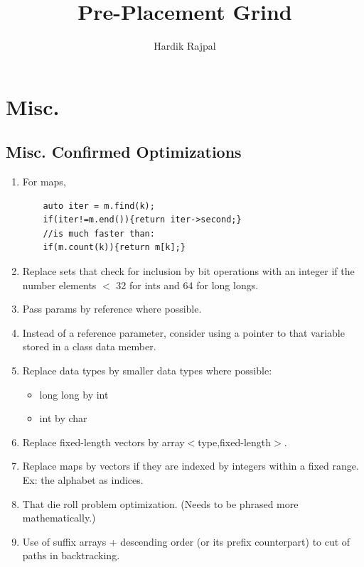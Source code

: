 \documentclass{report}
\author{Hardik Rajpal}
\begin{document}


\lstset{style=mystyle,language=C++}
\title{Pre-Placement Grind}
\maketitle
\tableofcontents
\pagebreak
\chapter{Misc.}
\section{Misc. Confirmed Optimizations}
\begin{enumerate}
    \item For maps,
\begin{lstlisting}
    auto iter = m.find(k);
    if(iter!=m.end()){return iter->second;}
    //is much faster than:
    if(m.count(k)){return m[k];}
\end{lstlisting}
    \item Replace sets that check for inclusion by bit operations with an integer if the number elements $<$ 32 for ints and 64 for long longs. 
    \item Pass params by reference where possible.
    \item Instead of a reference parameter, consider using a pointer to that variable stored in a class data member.
    \item Replace data types by smaller data types where possible:
        \begin{itemize}
            \item long long by int
            \item int by char
        \end{itemize} 
    \item Replace fixed-length vectors by array$<$type,fixed-length$>$.
    \item Replace maps by vectors if they are indexed by integers within a fixed range. Ex: the alphabet as indices.
    \item That die roll problem optimization. (Needs to be phrased more mathematically.)
    \item Use of suffix arrays + descending order (or its prefix counterpart) to cut of paths in backtracking.
\end{enumerate}
\end{document}
